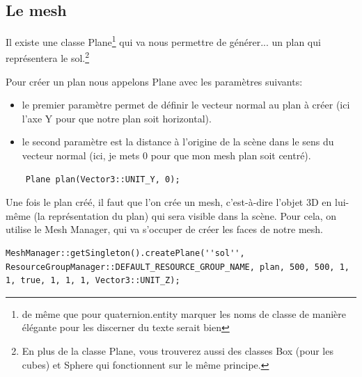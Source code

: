 \documentclass[10pt,a4paper]{report}
\begin{document}
\subsection{Le mesh}

Il existe une classe Plane\footnote{de m\^eme que pour quaternion.entity marquer les noms de classe de manière \'el\'egante pour les discerner du texte serait bien} qui va nous permettre de g\'en\'erer... un plan qui repr\'esentera le sol.\footnote{En plus de la classe Plane, vous trouverez aussi des classes Box (pour les cubes) et Sphere qui fonctionnent sur le m\^eme principe.}\newline

Pour cr\'eer un plan nous appelons Plane avec les param\`etres suivants:
\begin{itemize}
\item le premier param\`etre permet de d\'efinir le vecteur normal au plan \`{a} cr\'eer (ici l'axe Y pour que notre plan soit horizontal).
\item le second param\`etre est la distance \`{a} l'origine de la sc\`ene dans le sens du vecteur normal  (ici, je mets 0 pour que mon mesh plan soit centr\'e). 
\end{itemize}

\begin{lstlisting}
	Plane plan(Vector3::UNIT_Y, 0);
\end{lstlisting}

Une fois le plan cr\'e\'e, il faut que l'on cr\'ee un mesh, c'est-\`{a}-dire l'objet 3D en lui-m\^eme (la repr\'esentation du plan) qui sera visible dans la sc\`ene.
Pour cela, on utilise le Mesh Manager, qui va s'occuper de cr\'eer les faces de notre mesh.

\begin{lstlisting}
MeshManager::getSingleton().createPlane(''sol'', ResourceGroupManager::DEFAULT_RESOURCE_GROUP_NAME, plan, 500, 500, 1, 1, true, 1, 1, 1, Vector3::UNIT_Z);
\end{lstlisting}
\end{document}
